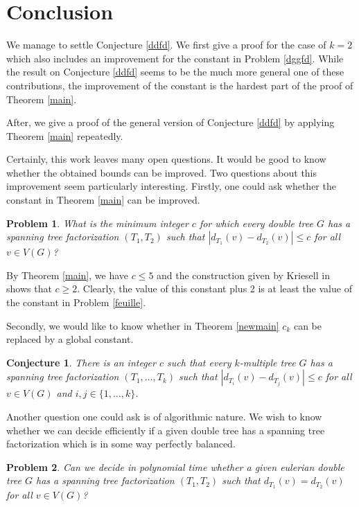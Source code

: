 \documentclass{article}
\theoremstyle{plain}
\newtheorem{Problem}{Problem}
\newtheorem{Conjecture}{Conjecture}
\theoremstyle{nonumberplain}
\theoremstyle{nonumberplain}
\newcommand{\stf}{spanning tree factorization }
\begin{document}
\section{Conclusion}\label{conc}

We manage to settle Conjecture \ref{ddfd}. We first give a proof for the case of $k=2$ which also includes an improvement for the constant in Problem \ref{dggfd}. While the result on Conjecture \ref{ddfd} seems to be the much more general one of these contributions, the improvement of the constant is the hardest part of the proof of  Theorem \ref{main}.

After, we give a proof of the general version of Conjecture \ref{ddfd} by applying Theorem \ref{main} repeatedly.

Certainly, this work leaves many open questions. It would be good to know whether the obtained bounds can be improved. Two questions about this improvement seem particularly interesting.
Firstly, one could ask whether the constant in Theorem \ref{main} can be improved. 
\begin{Problem}\label{prob5}
What is the minimum integer $c$ for which every double tree $G$ has a spanning tree factorization $(T_1,T_2)$ such that $|d_{T_1}(v)-d_{T_2}(v)|\leq c$ for all $v \in V(G)$?
\end{Problem}

By Theorem \ref{main}, we have $c \leq 5$ and the construction given by Kriesell in \cite{nk1} shows that $c \geq 2$. Clearly, the value of this constant plus 2 is at least the value of the constant in Problem \ref{feuille}. 

Secondly, we would like to know whether in Theorem \ref{newmain} $c_k$ can be replaced by a global constant.

\begin{Conjecture}
There is an integer $c$ such that every $k$-multiple tree $G$ has a \stf $(T_1,\ldots,T_k)$ such that $|d_{T_i}(v)-d_{T_j}(v)|\leq c$ for all $v \in V(G)$ and $i,j \in \{1,\ldots,k\}$.
\end{Conjecture}

Another question one could ask is of algorithmic nature. We wish to know whether we can decide efficiently if a given double tree has a \stf which is in some way perfectly balanced.

\begin{Problem}\label{prob2}
Can we decide in polynomial time whether a given eulerian double tree $G$ has a \stf $(T_1,T_2)$ such that $d_{T_1}(v)=d_{T_2}(v)$ for all $v \in V(G)$?
\end{Problem}
\end{document}

